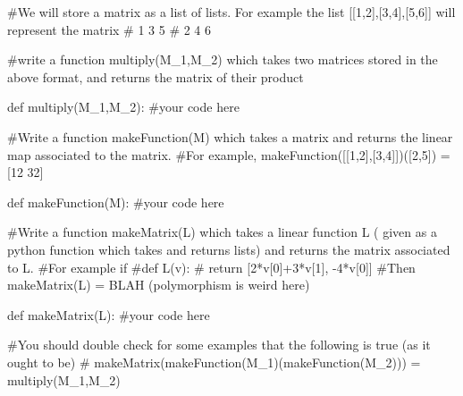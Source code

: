 	\begin{python}
		#We will store a matrix as a list of lists.   For example the list [[1,2],[3,4],[5,6]] will represent the matrix 
		# 1 3 5
		# 2 4 6
		
		#write a function multiply(M_1,M_2) which takes two matrices stored in the above format, and returns the matrix of their product
		
		def multiply(M_1,M_2):
			#your code here
		
		#Write a function makeFunction(M) which takes a matrix and returns the linear map associated to the matrix.
		#For example, makeFunction([[1,2],[3,4]])([2,5]) = [12 32]
		
		def makeFunction(M):
			#your code here
		
		#Write a function makeMatrix(L) which takes a linear function L ( given as a python function which takes and returns lists) and returns the matrix associated to L.
		#For example if  
		#def L(v):
		#  return [2*v[0]+3*v[1], -4*v[0]]
		#Then makeMatrix(L) = BLAH (polymorphism is weird here)
		
		def makeMatrix(L):
			#your code here
		
		#You should double check for some examples that the following is true (as it ought to be)
		# makeMatrix(makeFunction(M_1)(makeFunction(M_2))) = multiply(M_1,M_2)
		
		
	\end{python}
	
	
	
	
	

